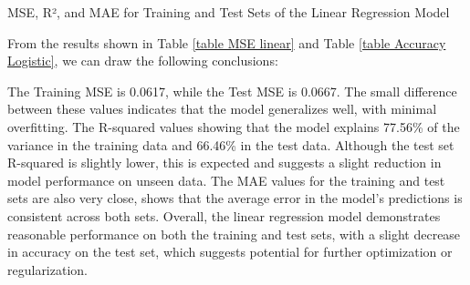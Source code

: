 \documentclass{article}
\begin{document}
\begin{table}[H]
    \centering
    \begin{minipage}{0.4\textwidth} %
        \centering
        \vspace{7pt}
        \caption{MSE, R², and MAE for Training and Test Sets of the Linear Regression Model}
        \label{table MSE linear}
    \end{minipage}
    \hfill
    \begin{minipage}{0.55\textwidth} %
        \centering
        \vspace{7pt}
        \caption{Accuracy, Precision, Recall, and F-1 score for Training and Test Sets of the Logistic Regression Model}
        \label{table Accuracy Logistic}
    \end{minipage}
\end{table}


\noindent From the results shown in Table \ref{table MSE linear} and Table \ref{table Accuracy Logistic}, we can draw the following conclusions:

The Training MSE is 0.0617, while the Test MSE is 0.0667. The small difference between these values indicates that the model generalizes well, with minimal overfitting.
The R-squared values showing that the model explains 77.56\% of the variance in the training data and 66.46\% in the test data. Although the test set R-squared is slightly lower, this is expected and suggests a slight reduction in model performance on unseen data.
The MAE values for the training and test sets are also very close, shows that the average error in the model’s predictions is consistent across both sets.
Overall, the linear regression model demonstrates reasonable performance on both the training and test sets, with a slight decrease in accuracy on the test set, which suggests potential for further optimization or regularization.
\end{document}

